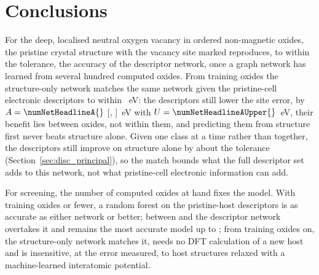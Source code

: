 \section{Conclusions}
\label{sec:conclusions}

For the deep, localised neutral oxygen vacancy in ordered non-magnetic oxides, the pristine crystal structure with the vacancy site marked reproduces, to within the tolerance, the accuracy of the descriptor network, once a graph network has learned from several hundred computed oxides. From \numNetNStar{} training oxides the structure-only network matches the same network given the \numRfElectronicNFeatures{} pristine-cell electronic descriptors to within \numNetTolerance{}~eV: the descriptors still lower the site error, by $A = \numNetHeadlineA{}$ [\numNetHeadlineALo{}, \numNetHeadlineAHi{}]~eV with $U = \numNetHeadlineAUpper{}$~eV, their benefit lies between oxides, not within them, and predicting them from structure first never beats structure alone. Given one class at a time rather than together, the descriptors still improve on structure alone by about the tolerance (Section~\ref{sec:disc_principal}), so the match bounds what the full descriptor set adds to this network, not what pristine-cell electronic information can add.

For screening, the number of computed oxides at hand fixes the model. With \numCfgBudgetsHostsItemThree{} training oxides or fewer, a random forest on the pristine-host descriptors is as accurate as either network or better; between \numCfgBudgetsHostsItemThree{} and \numCfgBudgetsHostsItemFour{} the descriptor network overtakes it and remains the most accurate model up to \numCfgBudgetsHostsItemFive{}; from \numNetNStar{} training oxides on, the structure-only network matches it, needs no DFT calculation of a new host and is insensitive, at the error measured, to host structures relaxed with a machine-learned interatomic potential.
